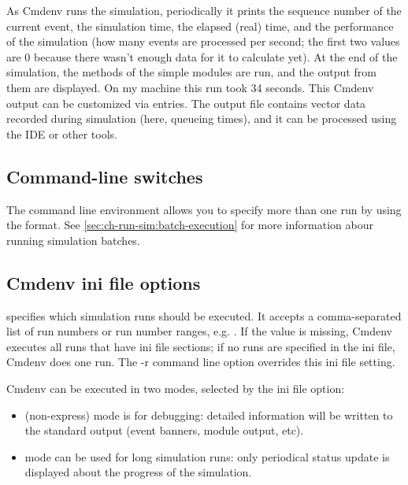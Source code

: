 As Cmdenv runs the simulation, periodically it prints the sequence number
of the current event, the simulation time, the elapsed (real) time,
and the performance of the simulation (how many events are processed per
second; the first two values are 0 because there wasn't enough data
for it to calculate yet). At the end of the simulation, the 
methods of the simple modules are run, and the output from them are displayed.
On my machine this run took 34 seconds. This Cmdenv output can be
customized via  entries. The output file 
contains vector data recorded during simulation (here, queueing times),
and it can be processed using the IDE or other tools.

\subsection{Command-line switches}

The command line environment allows you to specify more than one run by
using the  format. See \ref{sec:ch-run-sim:batch-execution}
for more information abour running simulation batches.

\subsection{Cmdenv ini file options}
\label{sec:ch-run-sim:cmdenv-section}

 specifies which simulation runs should be executed.
It accepts a comma-separated list of run numbers or run number ranges, e.g.
. If the value is missing, Cmdenv executes all runs that have
ini file sections; if no runs are specified in the ini file, Cmdenv does one run.
The -r command line option overrides this ini file setting.


Cmdenv can be executed in two modes, selected by the 
ini file option:

\begin{itemize}
    \item {} (non-express) mode is for debugging: detailed information
        will be written to the standard output (event banners, module output,
        etc).
    \item {} mode can be used for long simulation runs: only
        periodical status update is displayed about the progress of the
        simulation.
\end{itemize}


